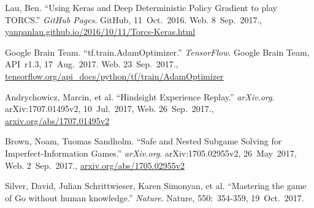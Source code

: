 \documentclass[a4paper,titlepage]{article}
\begin{document}
\begin{thebibliography}{99}
  Lau, Ben. ``Using Keras and Deep Deterministic Policy Gradient to play TORCS.'' \emph{GitHub Pages}. GitHub, 11~Oct.~2016. Web.
  8~Sep.~2017.,
  \url{yanpanlau.github.io/2016/10/11/Torcs-Keras.html}

  Google Brain Team. ``tf.train.AdamOptimizer.'' \emph{TensorFlow}. Google Brain Team, API~r1.3, 17~Aug.~2017. Web.
  23~Sep.~2017.,
  \url{tensorflow.org/api_docs/python/tf/train/AdamOptimizer}

  Andrychowicz, Marcin, et al. ``Hindsight Experience Replay.'' \emph{arXiv.org}. arXiv:1707.01495v2, 10~Jul.~2017, Web.
  26~Sep.~2017.,
  \url{arxiv.org/abs/1707.01495v2}

  Brown, Noam, Tuomas Sandholm. ``Safe and Nested Subgame Solving for Imperfect-Information Games.'' \emph{arXiv.org}. arXiv:1705.02955v2, 26~May~2017, Web. 2~Sep.~2017.,
  \url{arxiv.org/abs/1705.02955v2}

  Silver, David, Julian Schrittwieser, Karen Simonyan, et al. ``Mastering the game of Go without human knowledge.'' \emph{Nature}. Nature, 550:~354-359, 19~Oct.~2017.

\end{thebibliography}
\end{document}
